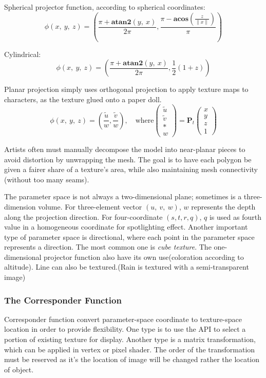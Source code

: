 \documentclass[10pt, a4paper]{article}
\begin{document}
        Spherical projector function, according to spherical coordinates: 
        $$\phi(x,\ y,\ z) = (\frac{\pi + \textbf{atan2}(y,\ x)}{2\pi}, \frac{\pi - \textbf{acos}(\frac{z}{\parallel x \parallel})}{\pi})$$

        Cylindrical:
        $$\phi(x,\ y,\ z) = (\frac{\pi + \textbf{atan2}(y,\ x)}{2\pi}, \frac{1}{2}(1 + z))$$
        
        Planar projection simply uses orthogonal projection to apply texture maps to characters, as the texture glued onto a paper doll. 
        \begin{equation*}
            \phi(x,\ y,\ z) = (\frac{\tilde{u}}{w}, \frac{\tilde{v}}{w}), \quad \text{where}
            \begin{pmatrix}
                \tilde{u} \\
                \tilde{v} \\
                * \\
                w 
            \end{pmatrix}
            = \textbf{P}_t
            \begin{pmatrix}
                x \\
                y \\
                z \\
                1
            \end{pmatrix}
        \end{equation*}


        Artists often must manually decompose the model into near-planar pieces to avoid distortion by unwrapping the mesh. The goal is to have each polygon be given a fairer share of a texture's area, while also maintaining mesh connectivity (without too many seams).
        
        The parameter space is not always a two-dimensional plane; sometimes is a three-dimension volume. For three-element vector $(u,\ v,\ w)$, $w$ represents the depth along the projection direction. For four-coordinate $(s, t, r, q)$, $q$ is used as fourth value in a homogeneous coordinate for spotlighting effect. Another important type of parameter space is directional, where each point in the parameter space represents a direction. The most common one is \emph{cube texture}. The one-dimensional projector function also have its own use(coloration according to altitude). Line can also be textured.(Rain is textured with a semi-transparent image)

    \subsubsection{The Corresponder Function}
        Corresponder function convert parameter-space coordinate to texture-space location in order to provide flexibility. One type is to use the API to select a portion of existing texture for display. Another type is a matrix transformation, which can be applied in vertex or pixel shader. The order of the transformation must be reserved as it's the location of image  will be changed rather the location of object. 
\end{document}
